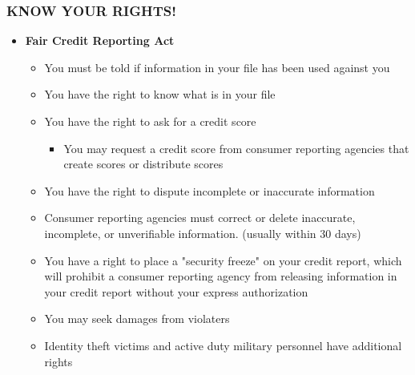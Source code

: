 \documentclass[12pt]{article}
\begin{document}
            \subsubsection{KNOW YOUR RIGHTS!}
                \begin{itemize}
                    \item \textbf{Fair Credit Reporting Act}
                        \begin{itemize}
                            \item You must be told if information in your file has been used against you
                            \item You have the right to know what is in your file
                            \item You have the right to ask for a credit score
                                \begin{itemize}
                                    \item You may request a credit score from consumer reporting agencies that create scores or
                                        distribute scores
                                \end{itemize}
                            \item You have the right to dispute incomplete or inaccurate information
                            \item Consumer reporting agencies must correct or delete inaccurate, incomplete, or unverifiable information.
                                (usually within 30 days)
                            \item You have a right to place a "security freeze" on your credit report, which will prohibit a consumer reporting
                                agency from releasing information in your credit report without your express authorization
                            \item You may seek damages from violaters
                            \item Identity theft victims and active duty military personnel have additional rights
                        \end{itemize}
                \end{itemize}
\end{document}
